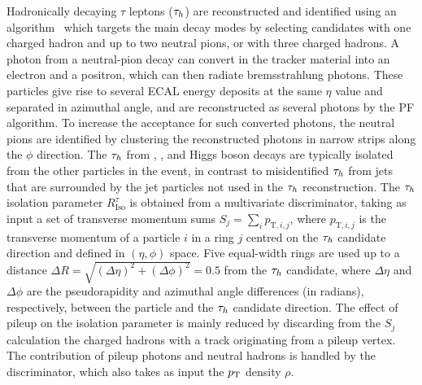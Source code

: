 \documentclass[11pt,twoside,a4paper,cmspaper,final,collab]{cms-tdr}
\begin{document}
Hadronically decaying $\tau$ leptons ($\tau_h$) are reconstructed and identified using an algorithm~\cite{CMS-PAS-TAU-11-001}
which targets the main decay modes by selecting candidates with one charged hadron and up to two neutral pions,
or with three charged hadrons.
A photon from a neutral-pion decay can convert in the tracker material into an electron and a positron, which can then radiate
bremsstrahlung photons. These particles give rise to several ECAL energy deposits at the same $\eta$ value and separated in azimuthal angle,
and are reconstructed as several photons by the PF algorithm. To increase the acceptance for such converted photons,
the neutral pions are identified by clustering the reconstructed photons in narrow strips along the $\phi$ direction.
The $\tau_h$ from \PW, \cPZ, and Higgs boson decays are typically isolated from the other particles in the event, in contrast to misidentified $\tau_h$ from
jets that are surrounded by the jet particles not used in the $\tau_h$ reconstruction.
The $\tau_h$ isolation parameter $R_\text{Iso}^{\tau}$ is obtained from a multivariate discriminator,
 taking as input a set of transverse momentum sums $S_{j} = \sum_i p_{\mathrm{T}, i, j}$, where $p_{\mathrm{T}, i, j}$
 is the transverse momentum of a particle $i$ in a ring $j$ centred on the $\tau_h$ candidate direction
and defined in $(\eta, \phi)$ space.
Five equal-width rings are used up to a distance $\Delta R = \sqrt{(\Delta \eta)^2 + (\Delta \phi)^2}=0.5$ from the $\tau_h$ candidate, where
$\Delta \eta$ and $\Delta \phi$ are the pseudorapidity and azimuthal angle differences (in radians), respectively, between the particle
and the $\tau_h$ candidate direction.
The effect of pileup on the isolation parameter is mainly reduced by discarding from the $S_{j}$
calculation the charged hadrons with a track originating from a pileup vertex.
The contribution of pileup photons and neutral hadrons is handled by the discriminator,
which also takes as input the $p_{\mathrm{T}}$ density $\rho$.
\end{document}
